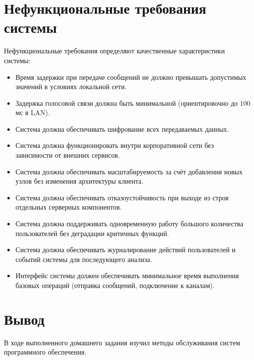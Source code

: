 \documentclass[14pt,a4paper]{extarticle}
\begin{document}
\section{Нефункциональные требования системы}

Нефункциональные требования определяют качественные характеристики системы:

\begin{itemize}
    \item Время задержки при передаче сообщений не должно превышать допустимых значений в условиях локальной сети.
    \item Задержка голосовой связи должна быть минимальной (ориентировочно до 100 мс в LAN).
    \item Система должна обеспечивать шифрование всех передаваемых данных.
    \item Система должна функционировать внутри корпоративной сети без зависимости от внешних сервисов.
    \item Система должна обеспечивать масштабируемость за счёт добавления новых узлов без изменения архитектуры клиента.
    \item Система должна обеспечивать отказоустойчивость при выходе из строя отдельных серверных компонентов.
    \item Система должна поддерживать одновременную работу большого количества пользователей без деградации критичных функций.
    \item Система должна обеспечивать журналирование действий пользователей и событий системы для последующего анализа.
    \item Интерфейс системы должен обеспечивать минимальное время выполнения базовых операций (отправка сообщений, подключение к каналам).
\end{itemize}

\section{Вывод}
В ходе выполненного домашнего задания изучил методы обслуживания систем программного обеспечения.
\end{document}
